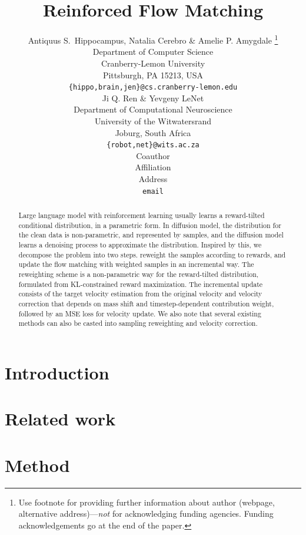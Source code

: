 \documentclass{article} %
\title{Reinforced Flow Matching}
\author{Antiquus S.~Hippocampus, Natalia Cerebro \& Amelie P. Amygdale \thanks{ Use footnote for providing further information
about author (webpage, alternative address)---\emph{not} for acknowledging
funding agencies.  Funding acknowledgements go at the end of the paper.} \\
Department of Computer Science\\
Cranberry-Lemon University\\
Pittsburgh, PA 15213, USA \\
\texttt{\{hippo,brain,jen\}@cs.cranberry-lemon.edu} \\
\And
Ji Q. Ren \& Yevgeny LeNet \\
Department of Computational Neuroscience \\
University of the Witwatersrand \\
Joburg, South Africa \\
\texttt{\{robot,net\}@wits.ac.za} \\
\AND
Coauthor \\
Affiliation \\
Address \\
\texttt{email}
}
\begin{document}
\maketitle

\begin{abstract}
Large language model with reinforcement learning
usually learns a reward-tilted conditional distribution,
in a parametric form.
In diffusion model,
the distribution for the clean data 
is non-parametric, and
represented by samples,
and the diffusion model learns a denoising process
to approximate the distribution.
Inspired by this,
we decompose the problem into two steps.
reweight the samples according to rewards,
and update the flow matching with weighted samples
in an incremental way.
The reweighting scheme is a non-parametric way for the reward-tilted distribution,
formulated
from KL-constrained reward maximization. 
The incremental update consists of the target velocity 
estimation from the original velocity
and velocity correction that depends on  mass shift 
and timestep-dependent contribution weight,
followed by an MSE loss for velocity update.
We also note that
several existing methods
can also be casted into 
sampling reweighting and 
velocity correction.


\end{abstract}


\section{Introduction}
\label{sec:intro}

\section{Related work}
\label{sec:related_work}


\section{Method}
\end{document}
